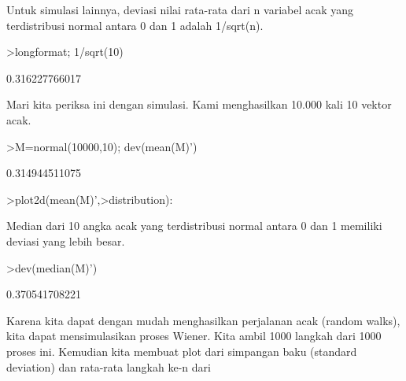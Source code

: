 \documentclass[12pt,arial,letterpaper]{book}
\begin{document}
\begin{eulercomment}
\begin{eulercomment}
\begin{eulercomment}
\begin{eulercomment}
\begin{eulercomment}
\begin{eulercomment}
\begin{eulercomment}
\begin{eulercomment}
\begin{eulercomment}
\begin{eulercomment}
\begin{eulercomment}
\begin{eulercomment}
\begin{eulercomment}
\begin{eulercomment}
\begin{eulercomment}
\begin{eulercomment}
\begin{eulercomment}
\begin{eulercomment}
\begin{eulercomment}
\begin{eulercomment}
\begin{eulercomment}
\begin{eulercomment}
\begin{eulercomment}
\begin{eulercomment}
\begin{eulercomment}
\begin{eulercomment}
\begin{eulercomment}
\begin{eulercomment}
\begin{eulercomment}
\begin{eulercomment}
\begin{eulercomment}
\begin{eulercomment}
\begin{eulercomment}
Untuk simulasi lainnya, deviasi nilai rata-rata dari n variabel acak
yang terdistribusi normal antara 0 dan 1 adalah 1/sqrt(n).
\end{eulercomment}
\begin{eulerprompt}
>longformat; 1/sqrt(10)
\end{eulerprompt}
\begin{euleroutput}
  0.316227766017
\end{euleroutput}
\begin{eulercomment}
Mari kita periksa ini dengan simulasi. Kami menghasilkan 10.000 kali
10 vektor acak.
\end{eulercomment}
\begin{eulerprompt}
>M=normal(10000,10); dev(mean(M)')
\end{eulerprompt}
\begin{euleroutput}
  0.314944511075
\end{euleroutput}
\begin{eulerprompt}
>plot2d(mean(M)',>distribution):
\end{eulerprompt}
\begin{eulercomment}
Median dari 10 angka acak yang terdistribusi normal antara 0 dan 1
memiliki deviasi yang lebih besar.
\end{eulercomment}
\begin{eulerprompt}
>dev(median(M)')
\end{eulerprompt}
\begin{euleroutput}
  0.370541708221
\end{euleroutput}
\begin{eulercomment}
Karena kita dapat dengan mudah menghasilkan perjalanan acak (random
walks), kita dapat mensimulasikan proses Wiener. Kita ambil 1000
langkah dari 1000 proses ini. Kemudian kita membuat plot dari
simpangan baku (standard deviation) dan rata-rata langkah ke-n dari

\end{eulercomment}
\end{eulercomment}
\end{eulercomment}
\end{eulercomment}
\end{eulercomment}
\end{eulercomment}
\end{eulercomment}
\end{eulercomment}
\end{eulercomment}
\end{eulercomment}
\end{eulercomment}
\end{eulercomment}
\end{eulercomment}
\end{eulercomment}
\end{eulercomment}
\end{eulercomment}
\end{eulercomment}
\end{eulercomment}
\end{eulercomment}
\end{eulercomment}
\end{eulercomment}
\end{eulercomment}
\end{eulercomment}
\end{eulercomment}
\end{eulercomment}
\end{eulercomment}
\end{eulercomment}
\end{eulercomment}
\end{eulercomment}
\end{eulercomment}
\end{eulercomment}
\end{eulercomment}
\end{eulercomment}
\end{document}
